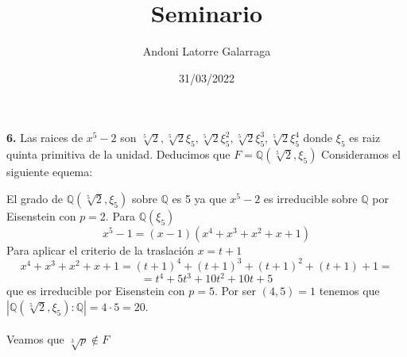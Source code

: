 \documentclass{article}
\title{Seminario}
\author{Andoni Latorre Galarraga}
\date{31/03/2022}
\newcommand{\bb}[1]{\mathbb{#1}}
\begin{document}
\maketitle

\begin{multicols}{2}

\noindent \textbf{6.} Las raices de $x^5-2$ son $\sqrt[5]{2}, \sqrt[5]{2} \xi_5, \sqrt[5]{2} \xi_5^2, \sqrt[5]{2} \xi_5^3, \sqrt[5]{2} \xi_5^4$ donde $\xi_5$ es raiz quinta primitiva de la unidad. Deducimos que $F = \mathbb{Q}(\sqrt[5]{2}, \xi_5)$ Consideramos el siguiente equema:
\begin{center}
\end{center}
\noindent El grado de $\mathbb{Q}(\sqrt[5]{2}, \xi_5)$ sobre $\bb{Q}$ es 5 ya que $x^5-2$ es irreducible sobre $\bb{Q}$ por Eisenstein con $p=2$. Para $\mathbb{Q}(\xi_5)$
$$
x^5-1 = (x - 1) (x^4 + x^3 + x^2 + x + 1)
$$
Para aplicar el criterio de la traslación $x=t+1$
$$
x^4 + x^3 + x^2 + x + 1 = (t+1)^4 + (t+1)^3 + (t+1)^2 + (t+1) + 1 =
$$
$$
= t^4 + 5 t^3 + 10 t^2 + 10 t + 5
$$
que es irreducible por Eisenstein con $p=5$. Por ser $(4,5)=1$ tenemos que $|\mathbb{Q}(\sqrt[5]{2}, \xi_5):\bb{Q}| = 4\cdot 5 = 20$.\\\\
Veamos que $\sqrt[3]{p}\notin F$

\begin{center}
\end{center}


\end{multicols}
\end{document}
